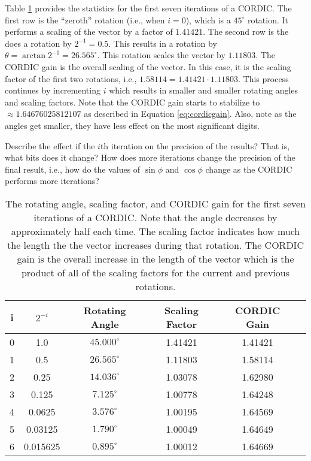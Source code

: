Table \ref{table:cordic} provides the statistics for the first seven iterations of a CORDIC. The first row is the ``zeroth'' rotation (i.e., when $i=0$), which is a $45^{\circ}$ rotation. It performs a scaling of the vector by a factor of $1.41421$. The second row is the does a rotation by $2^{-1} = 0.5$. This results in a rotation by $\theta = \arctan 2^{-1} = 26.565^{\circ}$. This rotation scales the vector by $1.11803$. The CORDIC gain is the overall scaling of the vector. In this case, it is the scaling factor of the first two rotations, i.e., $1.58114 = 1.41421 \cdot 1.11803$. This process continues by incrementing $i$ which results in smaller and smaller rotating angles and scaling factors. Note that the CORDIC gain starts to stabilize to $\approx 1.64676025812107$ as described in Equation \ref{eq:cordicgain}. Also, note as the angles get smaller, they have less effect on the most significant digits. 

\begin{exercise}
Describe the effect if the $i$th iteration on the precision of the results? That is, what bits does it change? How does more iterations change the precision of the final result, i.e., how do the values of $\sin \phi$ and $\cos \phi$ change as the CORDIC performs more iterations?
\end{exercise}



\begin{table}[htbp]
\caption{The rotating angle, scaling factor, and CORDIC gain for the first seven iterations of a CORDIC. Note that the angle decreases by approximately half each time. The scaling factor indicates how much the length the the vector increases during that rotation. The CORDIC gain is the overall increase in the length of the vector which is the product of all of the scaling factors for the current and previous rotations.}
\begin{center}
\begin{scriptsize}
\begin{tabular}{|c|c|c|c|c|c|}
\hline
i & $2^{-i}$ 	& Rotating Angle  	& Scaling Factor 	& CORDIC Gain 	\\ \hline \hline
0 & 1.0 		& $45.000^{\circ}$	& 1.41421			& 1.41421		\\ \hline
1 & 0.5 		& $26.565^{\circ}$	& 1.11803			& 1.58114		\\ \hline
2 & 0.25 		& $14.036^{\circ}$	& 1.03078			& 1.62980		\\ \hline
3 & 0.125 		& $7.125^{\circ}$	& 1.00778			& 1.64248		\\ \hline
4 & 0.0625 	& $3.576^{\circ}$	& 1.00195			& 1.64569		\\ \hline
5 & 0.03125 	& $1.790^{\circ}$	& 1.00049			& 1.64649		\\ \hline
6 & 0.015625 	& $0.895^{\circ}$	& 1.00012			& 1.64669		\\ \hline
\end{tabular}
\end{scriptsize}
\end{center}
\label{table:cordic}
\end{table}%

